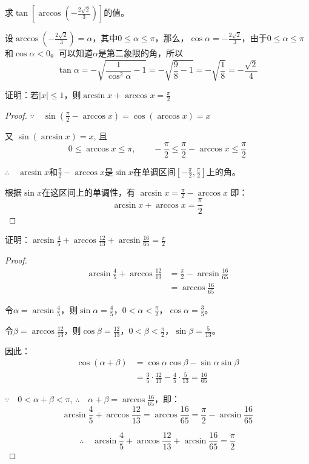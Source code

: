 \begin{example}
求$\tan\left[\arccos\left(-\frac{2\sqrt{2}}{3}\right)\right]$的值。
\end{example}

\begin{solution}
设$\arccos\left(-\frac{2\sqrt{2}}{3}\right)=\alpha$，其中$0\le \alpha\le \pi$，那么，$\cos\alpha=-\frac{2\sqrt{2}}{3}$，由于$0\le\alpha\le \pi$和$\cos\alpha<0$。可以知道$\alpha$是第二象限的角，所以
\[\tan\alpha=-\sqrt{\frac{1}{\cos^2\alpha}-1}=-\sqrt{\frac{9}{8}-1}=-\sqrt{\frac{1}{8}}=-\frac{\sqrt{2}}{4}\]
\end{solution}


\begin{example}
证明：若$|x|\le 1$，则$\arcsin x+\arccos x=\frac{\pi}{2}$

\end{example}

\begin{proof}
 $\because\quad    \sin\left(\frac{\pi}{2}-\arccos x\right)=\cos(\arccos x)=x$

    又    $\sin(\arcsin x)=x$, 且
  \[  0\le \arccos x\le \pi,\qquad -\frac{\pi}{2}\le \frac{\pi}{2}-\arccos x\le \frac{\pi}{2}\]

$\therefore\quad \arcsin x$和$\frac{\pi}{2}-\arccos x$是$\sin x$在单调区间$\left[-\frac{\pi}{2},\frac{\pi}{2}\right]$上的角。

根据$\sin x$在这区间上的单调性，有
$\arcsin x=\frac{\pi}{2}-\arccos x$
即：
\[\arcsin x+\arccos x=\frac{\pi}{2}\]
\end{proof}

\begin{example}
证明：$\arcsin\frac{4}{5}+\arccos\frac{12}{13}+\arcsin\frac{16}{65}=\frac{\pi}{2}$
\end{example}

\begin{proof}
\[\begin{split}
    \arcsin\frac{4}{5}+\arccos\frac{12}{13}&=\frac{\pi}{2}-\arcsin\frac{16}{65}\\
&=\arccos\frac{16}{65}
\end{split}\]
    
令$\alpha=\arcsin\frac{4}{5}$，则$\sin\alpha=\frac{4}{5}$，$0<\alpha<\frac{\pi}{2}$，$\cos\alpha=\frac{3}{5}$。

令$\beta=\arccos\frac{12}{13}$，则$\cos\beta=\frac{12}{13}$，$0<\beta<\frac{\pi}{2}$，$\sin\beta=\frac{5}{13}$。

因此：\[\begin{split}
    \cos(\alpha+\beta)&=\cos\alpha\cos\beta-\sin\alpha\sin\beta\\
    &=\frac{3}{5}\cdot \frac{12}{13}-\frac{4}{5}\cdot \frac{5}{13}=\frac{16}{65}
\end{split}\]

$\because\quad 0<\alpha+\beta<\pi$, $\therefore\quad \alpha+\beta=\arccos\frac{16}{65}$，即：
\[\arcsin\frac{4}{5}+\arccos\frac{12}{13}=\arccos\frac{16}{65}=\frac{\pi}{2}-\arcsin\frac{16}{65}\]

\[\therefore\quad \arcsin\frac{4}{5}+\arccos\frac{12}{13}+\arcsin\frac{16}{65}=\frac{\pi}{2}\]
\end{proof}

